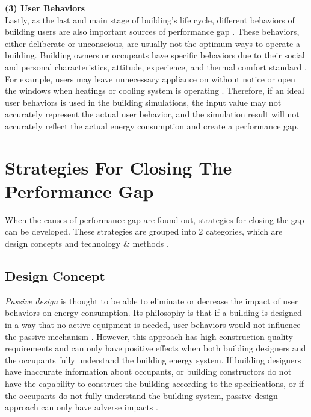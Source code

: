 \documentclass[a4paper, oneside]{discothesis}
\begin{document}
		\textbf{(3) User Behaviors}\\
		Lastly, as the last and main stage of building's life cycle, different behaviors of building users are also important sources of performance gap \cite{ZOU2018165}. These behaviors, either deliberate or unconscious, are usually not the optimum ways to operate a building. Building owners or occupants have specific behaviors due to their social and personal characteristics, attitude, experience, and thermal comfort standard \cite{userevaluations,LAWRENCE2016651}. For example, users may leave unnecessary appliance on without notice or open the windows when heatings or cooling system is operating \cite{FREI2017421}. Therefore, if an ideal user behaviors is used in the building simulations, the input value may not accurately represent the actual user behavior, and the simulation result will not accurately reflect the actual energy consumption and create a performance gap.\\

	\section{Strategies For Closing The Performance Gap} 
		When the causes of performance gap are found out, strategies for closing the gap can be developed. These strategies are grouped into 2 categories, which are design concepts and technology \& methods \cite{ZOU2018165}.

		\subsection{Design Concept}
			\textit{Passive design} is thought to be able to eliminate or decrease the impact of user behaviors on energy consumption. Its philosophy is that if a building is designed in a way that no active equipment is needed, user behaviors would not influence the passive mechanism \cite{BLIGHT2013183,NORFORD1994121}. However, this approach has high construction quality requirements and can only have positive effects when both building designers and the occupants fully understand the building energy system. If building designers have inaccurate information about occupants, or building constructors do not have the capability to construct the building according to the specifications, or if the occupants do not fully understand the building system, passive design approach can only have adverse impacts \cite{ZOU2018165}.\\
\end{document}
